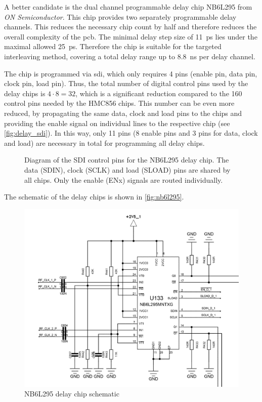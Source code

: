 A better candidate is the dual channel programmable delay chip NB6L295 from \textit{ON Semiconductor}. 
This chip provides two separately programmable delay channels. 
This reduces the necessary chip count by half and therefore reduces the overall complexity of the \gls{pcb}.
The minimal delay step size of \SI{11}{\pico\second} lies under the maximal allowed \SI{25}{\pico \second}. Therefore the chip is suitable for the targeted interleaving method, covering a total delay range up to \SI{8.8}{\nano\second} per delay channel.

The chip is programmed via \gls{sdi}, which only requires 4 pins (enable pin, data pin, clock pin, load pin). 
Thus, the total number of digital control pins used by the delay chips is $4\cdot8 = 32$, which is a significant reduction compared to the 160 control pins needed by the HMC856 chips. 
This number can be even more reduced, by propagating the same data, clock and load pins to the chips and providing the enable signal on individual lines to the respective chip (see \autoref{fig:delay_sdi}). 
In this way, only 11 pins (8 enable pins and 3 pins for data, clock and load) are necessary in total for programming all delay chips. 

\begin{figure}[tb]
	\centering
	\resizebox{1\textwidth}{!}{}
	\caption[Delay chip SDI connections]{Diagram of the SDI control pins for the NB6L295 delay chip. The data (SDIN), clock (SCLK) and load (SLOAD) pins are shared by all chips. Only the enable (ENx) signals are routed individually.}
	\label{fig:delay_sdi}
\end{figure}

The schematic of the delay chips is shown in \autoref{fig:nb6l295}.
\begin{figure}[tb]
	\centering
	\includegraphics[width = \textwidth]{chap/04-theresa/img/schematic/delay_chip}
	\caption{NB6L295 delay chip schematic}
	\label{fig:nb6l295}
\end{figure}

